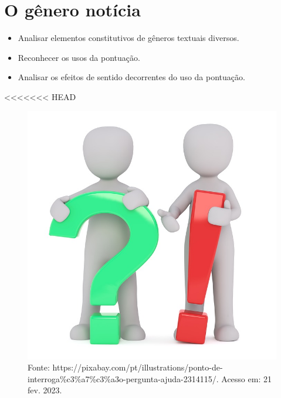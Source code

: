 \chapter{O gênero notícia}



\begin{itemize}
\item Analisar elementos constitutivos de gêneros textuais diversos.

\item Reconhecer os usos da pontuação.

\item Analisar os efeitos de sentido decorrentes do uso da pontuação.
\end{itemize}

<<<<<<< HEAD
\begin{figure}[htpb!]
\includegraphics[width=.5\textwidth]{./imgs/img7.jpg}
\caption{Fonte: https://pixabay.com/pt/illustrations/ponto-de-interroga\%c3\%a7\%c3\%a3o-pergunta-ajuda-2314115/. Acesso em: 21 fev. 2023.}
\end{figure}

